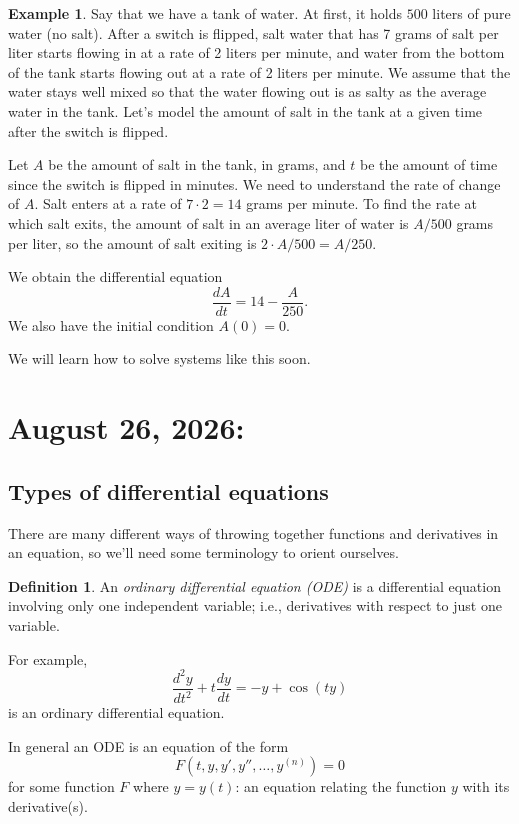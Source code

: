 \documentclass[12pt]{amsart}
\numberwithin{equation}{section}
\theoremstyle{plain} %
\newcommand{\aug}[2]{\section{August #1, 2026: \textsection{#2}}}
\theoremstyle{definition}
\newtheorem{defn}[equation]{Definition}
\newtheorem{ex}[equation]{Example}
\theoremstyle{remark}
\begin{document}
\begin{ex} Say that we have a tank of water. At first, it holds $500$ liters of pure water (no salt). After a switch is flipped, salt water that has 7 grams of salt per liter starts flowing in at a rate of 2 liters per minute, and water from the bottom of the tank starts flowing out at a rate of 2 liters per minute. We assume that the water stays well mixed so that the water flowing out is as salty as the average water in the tank. 
Let's model the amount of salt in the tank at a given time after the switch is flipped.

Let $A$ be the amount of salt in the tank, in grams, and $t$ be the amount of time since the switch is flipped in minutes.
We need to understand the rate of change of $A$. Salt enters at a rate of $7 \cdot 2 = 14$ grams per minute. To find the rate at which salt exits, the amount of salt in an average liter of water is $A/500$ grams per liter, so the amount of salt exiting is $2 \cdot A/500 = A/250$.

We obtain the differential equation
\[ \frac{dA}{dt} = 14 - \frac{A}{250}.\]
We also have the initial condition $A(0)=0$.

We will learn how to solve systems like this soon.
\end{ex}



\aug{26}{1.2}

\subsection*{Types of differential equations}

There are many different ways of throwing together functions and derivatives in an equation, so we'll need some terminology to orient ourselves.

\begin{defn} An \emph{ordinary differential equation (ODE)} is a differential equation involving only one independent variable; i.e., derivatives with respect to just one variable.
\end{defn}
 For example,
 \[ \frac{d^2 y}{dt^2} + t \frac{dy}{dt} = -y + \cos(ty)\]
 is an ordinary differential equation.
 
In general an ODE is an equation of the form \[F(t,y,y',y'',\dots,y^{(n)})=0\] for some function $F$ where $y=y(t)$: an equation relating the function $y$ with its derivative(s).
\end{document}
